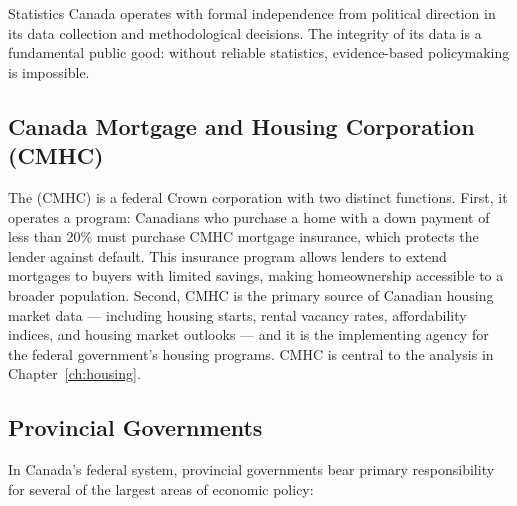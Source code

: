 Statistics Canada operates with formal independence from political direction
in its data collection and methodological decisions. The integrity of its
data is a fundamental public good: without reliable statistics, evidence-based
policymaking is impossible.

\subsection{Canada Mortgage and Housing Corporation (CMHC)}

The  (CMHC) is a federal
Crown corporation with two distinct functions. First, it operates a
 program: Canadians who purchase a home with
a down payment of less than 20\% must purchase CMHC mortgage insurance,
which protects the lender against default. This insurance program
allows lenders to extend mortgages to buyers with limited savings, making
homeownership accessible to a broader population. Second, CMHC is the
primary source of Canadian housing market data --- including housing starts,
rental vacancy rates, affordability indices, and housing market outlooks ---
and it is the implementing agency for the federal government's housing programs.
CMHC is central to the analysis in Chapter~\ref{ch:housing}.

\subsection{Provincial Governments}

In Canada's federal system, provincial governments bear primary responsibility
for several of the largest areas of economic policy:

